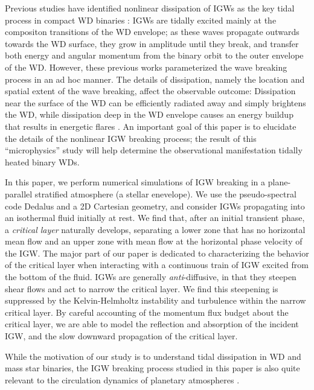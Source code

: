 \documentclass[
        fleqn,
        usenatbib,
        referee,
    ]{mnras}
\begin{document}
Previous studies have identified nonlinear dissipation of IGWs as the key tidal
process in compact WD binaries \citep{fullerII,fullerIV,tidal_novae,bukart}:
IGWs are tidally excited mainly at the compositon transitions of the WD
envelope; as these waves propagate outwards towards the WD surface, they grow
in amplitude until they break, and transfer both energy and angular momentum
from the binary orbit to the outer envelope of the WD\@.
However, these previous works parameterized the wave breaking process in an ad
hoc manner. The details of dissipation, namely the location and spatial extent
of the wave breaking, affect the observable outcome: Dissipation near the
surface of the WD can be efficiently radiated away and simply brightens the WD,
while dissipation deep in the WD envelope causes an energy buildup that results
in energetic flares \citep{tidal_novae}. An important goal of this paper is to
elucidate the details of the nonlinear IGW breaking process; the result of this
``microphysics'' study will help determine the observational manifestation
tidally heated binary WDs.

In this paper, we perform numerical simulations of IGW breaking in a
plane-parallel stratified atmosphere (a stellar enevelope). We use the
pseudo-spectral code Dedalus \citep{dedalus,dedalus2} and a 2D Cartesian
geometry, and consider IGWs propagating into an isothermal fluid initially at
rest. We find that, after an initial transient phase, a \emph{critical layer}
naturally develops, separating a lower zone that has no horizontal mean flow
and an upper zone with mean flow at the horizontal phase velocity of the IGW\@.
The major part of our paper is dedicated to characterizing the behavior of the
critical layer when interacting with a continuous train of IGW excited from the
bottom of the fluid. IGWs are generally \emph{anti}-diffusive, in that they
steepen shear flows \citep{lindzen_qbo,lecoanet_meanflow} and act to narrow the
critical layer. We find this steepening is suppressed by the Kelvin-Helmholtz
instability and turbulence within the narrow critical layer. By careful
accounting of the momentum flux budget about the critical layer, we are able to
model the reflection and absorption of the incident IGW, and the slow downward
propagation of the critical layer.

While the motivation of our study is to understand tidal dissipation
in WD and mass star binaries, the IGW breaking process studied in this paper
is also quite relevant to the circulation dynamics of planetary atmospheres
\citep[see e.g.][]{lindzen1981turbulence,holton1983influence}.
\end{document}
